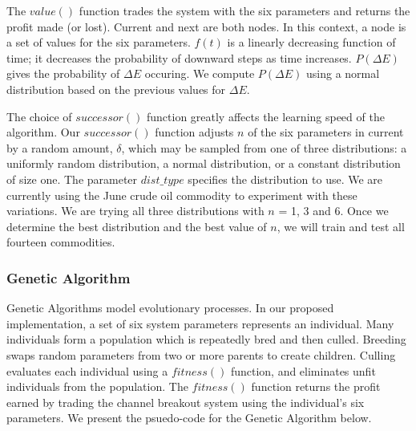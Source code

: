 \documentclass[10pt]{article}
\begin{document}
The $value()$ function trades the system with the six parameters and returns the
profit made (or lost).  Current and next are both nodes.  In this context, a
node is a set of values for the six parameters. $f(t)$ is a linearly decreasing
function of time; it decreases the probability of downward steps as time
increases. $P(\Delta E)$ gives the probability of $\Delta E$ occuring. We
compute $P(\Delta E)$ using a normal distribution based on the previous values
for $\Delta E$.

The choice of $successor()$ function greatly affects the learning speed of the
algorithm.  Our $successor()$ function adjusts $n$ of the six parameters in current
by a random amount, $\delta$, which may be sampled from one of three
distributions: a uniformly random distribution, a normal distribution, or a
constant distribution of size one.  The parameter $dist\_type$ specifies the
distribution to use.  We are currently using the June crude oil commodity to
experiment with these variations. We are trying all three distributions with
$n$ = 1, 3 and 6.  Once we determine the best distribution and the best value
of $n$, we will train and test all fourteen commodities.

\pagebreak

\subsubsection{Genetic Algorithm}

Genetic Algorithms model evolutionary processes.  In our proposed
implementation, a set of six system parameters represents an individual.  Many
individuals form a population which is repeatedly bred and then culled.
Breeding swaps random parameters from two or more parents to create children.
Culling evaluates each individual using a $fitness()$ function, and eliminates
unfit individuals from the population.  The $fitness()$ function returns the
profit earned by trading the channel breakout system using the individual's six
parameters.  We present the psuedo-code for the Genetic Algorithm below.
\end{document}
